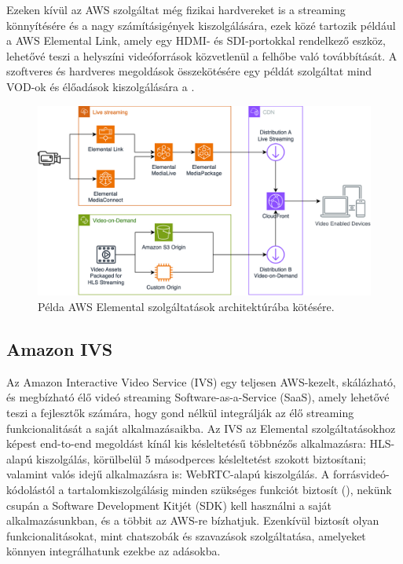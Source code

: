 Ezeken kívül az AWS szolgáltat még fizikai hardvereket is a streaming könnyítésére és a nagy számításigények kiszolgálására, ezek közé tartozik például a AWS Elemental Link, amely egy HDMI- és SDI-portokkal rendelkező eszköz, lehetővé teszi a helyszíni videóforrások közvetlenül a felhőbe való továbbítását. A szoftveres és hardveres megoldások összekötésére egy példát szolgáltat mind VOD-ok és élőadások kiszolgálására a .

\begin{figure}[ht]
	\centering
	\includegraphics[width=120mm, keepaspectratio]{figures/dipterv_vodlive.png}
	\caption{Példa AWS Elemental szolgáltatások architektúrába kötésére.}
	\label{fig:vodlive}
\end{figure}

\subsection{Amazon IVS}

Az Amazon Interactive Video Service (IVS) egy teljesen AWS-kezelt, skálázható, és megbízható élő videó streaming Software-as-a-Service (SaaS), amely lehetővé teszi a fejlesztők számára, hogy gond nélkül integrálják az élő streaming funkcionalitását a saját alkalmazásaikba. Az IVS az Elemental szolgáltatásokhoz képest end-to-end megoldást kínál kis késleltetésű többnézős alkalmazásra: HLS-alapú kiszolgálás, körülbelül 5 másodperces késleltetést szokott biztosítani; valamint valós idejű alkalmazásra is: WebRTC-alapú kiszolgálás. \cite{Ivs} A forrásvideó-kódolástól a tartalomkiszolgálásig minden szükséges funkciót biztosít (), nekünk csupán a Software Development Kitjét (SDK) kell használni a saját alkalmazásunkban, és a többit az AWS-re bízhatjuk. Ezenkívül biztosít olyan funkcionalitásokat, mint chatszobák és szavazások szolgáltatása, amelyeket könnyen integrálhatunk ezekbe az adásokba.

